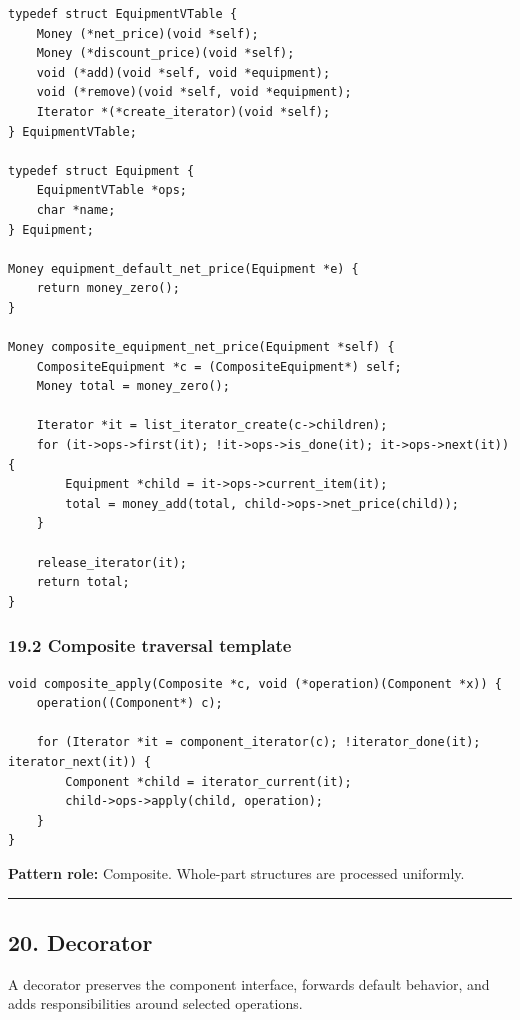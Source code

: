 \documentclass[11pt]{article}
\begin{document}
\begin{verbatim}
typedef struct EquipmentVTable {
    Money (*net_price)(void *self);
    Money (*discount_price)(void *self);
    void (*add)(void *self, void *equipment);
    void (*remove)(void *self, void *equipment);
    Iterator *(*create_iterator)(void *self);
} EquipmentVTable;

typedef struct Equipment {
    EquipmentVTable *ops;
    char *name;
} Equipment;

Money equipment_default_net_price(Equipment *e) {
    return money_zero();
}

Money composite_equipment_net_price(Equipment *self) {
    CompositeEquipment *c = (CompositeEquipment*) self;
    Money total = money_zero();

    Iterator *it = list_iterator_create(c->children);
    for (it->ops->first(it); !it->ops->is_done(it); it->ops->next(it)) {
        Equipment *child = it->ops->current_item(it);
        total = money_add(total, child->ops->net_price(child));
    }

    release_iterator(it);
    return total;
}
\end{verbatim}

\subsubsection{19.2 Composite traversal template}\label{composite-traversal-template}

\begin{verbatim}
void composite_apply(Composite *c, void (*operation)(Component *x)) {
    operation((Component*) c);

    for (Iterator *it = component_iterator(c); !iterator_done(it); iterator_next(it)) {
        Component *child = iterator_current(it);
        child->ops->apply(child, operation);
    }
}
\end{verbatim}

\textbf{Pattern role:} Composite. Whole-part structures are processed uniformly.

\begin{center}\rule{0.5\linewidth}{0.5pt}\end{center}

\subsection{20. Decorator}\label{decorator}

A decorator preserves the component interface, forwards default behavior, and adds responsibilities around selected operations.
\end{document}
